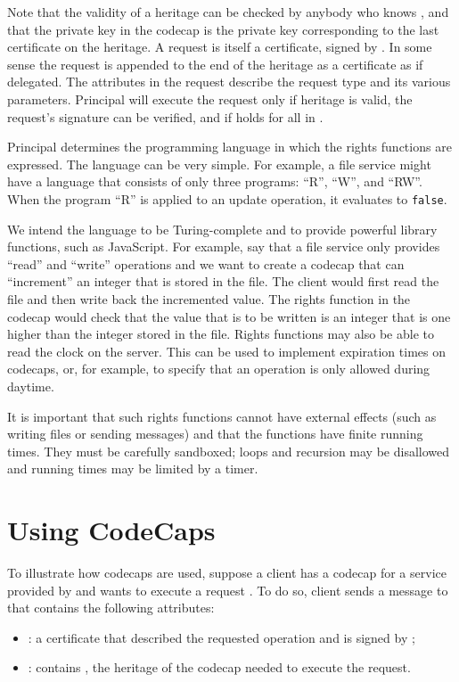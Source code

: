 \documentclass[10pt, conference, compsocconf]{IEEEtran}
\begin{document}
\noindent
Note that the validity of a heritage can be checked by anybody
who knows , and that the private key 
in the codecap is the private key corresponding to the last
certificate  on the heritage.
A request is itself a certificate, signed by .
In some sense the request is appended to the end of the heritage as
a certificate  as if delegated.
The attributes in the request describe the request type and its various
parameters.
Principal  will execute the request only if
heritage  is valid, the request's signature can be verified,
and if  holds for all  in .

Principal  determines the programming language in which the
rights functions are expressed.  The language can be very simple.
For example, a file service might have a language that consists of
only three programs: ``R'', ``W'', and ``RW''.
When the program ``R'' is applied to an update operation, it evaluates
to \texttt{false}.

We intend the language to be Turing-complete and to provide
powerful library functions, such as JavaScript.
For example, say that a file service only provides ``read'' and ``write''
operations and we want to create a codecap that can ``increment''
an integer that is stored in the file.  The client would first read
the file and then write back the incremented value.  The rights
function in the codecap would check that the value that is to be
written is an integer that is one higher than the integer stored
in the file.  Rights functions may also be able to read the clock
on the server.  This can be used to implement expiration times on
codecaps, or, for example, to specify that an operation is
only allowed during daytime.

It is important that such rights functions cannot have
external effects (such as writing files or sending messages) and
that the functions have finite running times.  They must be carefully
sandboxed; loops and recursion may be disallowed and running times
may be limited by a timer.

\section{Using CodeCaps}

To illustrate how codecaps are used, 
suppose a client  has a codecap  for a service
provided by  and wants  to execute a request .
To do so, client  sends a message  to  that contains the
following attributes:
\begin{itemize}
\item : a certificate that described the requested
operation and is signed by ;
\item : contains , the heritage of the
codecap needed to execute the request.
\end{itemize}
\end{document}
